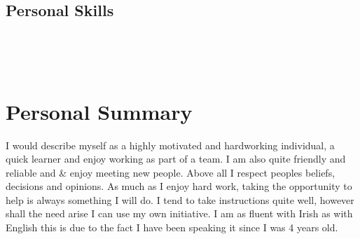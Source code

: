 \documentclass[]{friggeri-cv}
\begin{document}
\begin{aside}
  \section{Personal Skills}
    ~
\end{aside}
~
\section{Personal Summary}
{I would describe myself as a highly motivated and hardworking individual, a quick learner and enjoy working as part of a team. I am also quite friendly and reliable and & enjoy meeting new people. Above all I respect peoples beliefs, decisions and opinions. As much as I enjoy hard work, taking the opportunity to help is always something I will do. I tend to take instructions quite well, however shall the need arise I can use my own initiative. I am as fluent with Irish as with English this is due to the fact I have been speaking it since I was 4 years old.}
\begin{entrylist}

\end{entrylist}
\end{document}
